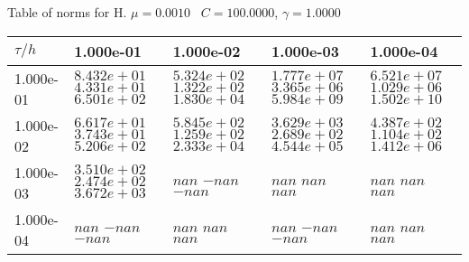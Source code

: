 \begin{center}
Table of norms for H. $\mu = 0.0010$ \, $C = 100.0000$, $\gamma = 1.0000$
  
\begin{tabular}{|p{1in}|p{1in}|p{1in}|p{1in}|p{1in}|} \hline
$\tau / h$ &1.000e-01 &1.000e-02 &1.000e-03 &1.000e-04 \\ \hline 
1.000e-01 & $8.432e+01$  $4.331e+01$  $6.501e+02$  & $5.324e+02$  $1.322e+02$  $1.830e+04$  & $1.777e+07$  $3.365e+06$  $5.984e+09$  & $6.521e+07$  $1.029e+06$  $1.502e+10$  \\ \hline 
1.000e-02 & $6.617e+01$  $3.743e+01$  $5.206e+02$  & $5.845e+02$  $1.259e+02$  $2.333e+04$  & $3.629e+03$  $2.689e+02$  $4.544e+05$  & $4.387e+02$  $1.104e+02$  $1.412e+06$  \\ \hline 
1.000e-03 & $3.510e+02$  $2.474e+02$  $3.672e+03$  & $nan$  $-nan$  $-nan$  & $nan$  $nan$  $nan$  & $nan$  $nan$  $nan$  \\ \hline 
1.000e-04 & $nan$  $-nan$  $-nan$  & $nan$  $nan$  $nan$  & $nan$  $-nan$  $-nan$  & $nan$  $nan$  $nan$  \\ \hline 

\end{tabular}\\[20pt]
\end{center}
